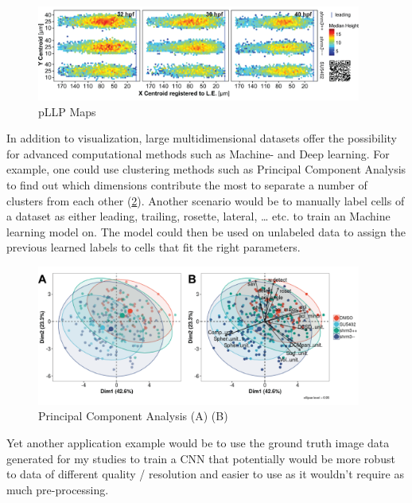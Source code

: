 \documentclass[11pt,singlespacinge,twoside]{reedthesis} %
\begin{document}
\begin{figure}

{\centering \includegraphics[width=0.95\textwidth]{figures/summary/methodology_mapr} 

}

\caption[pLLP Maps]{pLLP Maps}\label{fig:dismap}
\end{figure}
In addition to visualization, large multidimensional datasets offer the possibility for advanced computational methods such as Machine- and Deep learning. For example, one could use clustering methods such as Principal Component Analysis to find out which dimensions contribute the most to separate a number of clusters from each other (\ref{fig:dispca}). Another scenario would be to manually label cells of a dataset as either leading, trailing, rosette, lateral, \ldots{} etc. to train an Machine learning model on. The model could then be used on unlabeled data to assign the previous learned labels to cells that fit the right parameters.


\begin{figure}

{\centering \includegraphics[width=0.95\textwidth]{figures/summary/pca_fig} 

}

\caption[Principal Component Analysis]{Principal Component Analysis (A) (B)}\label{fig:dispca}
\end{figure}
Yet another application example would be to use the ground truth image data generated for my studies to train a CNN that potentially would be more robust to data of different quality / resolution and easier to use as it wouldn't require as much pre-processing.
\end{document}
